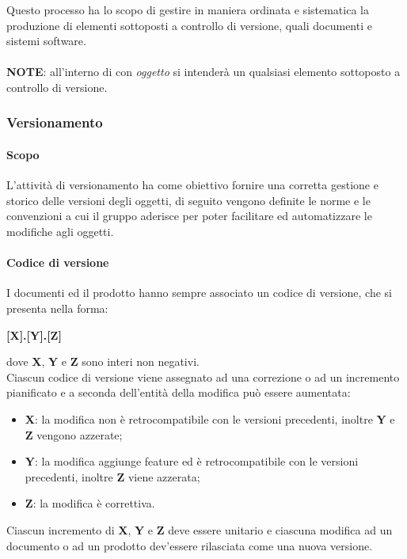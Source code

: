 Questo processo ha lo scopo di gestire in maniera ordinata e sistematica la produzione di elementi sottoposti a controllo di versione,
quali documenti e sistemi software.
\\
\\
\textbf{NOTE}: all'interno di  con \emph{oggetto} si intenderà un qualsiasi elemento sottoposto a
controllo di versione.

\subsubsection{Versionamento}
\label{ssub:gestione_configurazione:versionamento}

\paragraph{Scopo}

L'attività di versionamento ha come obiettivo fornire una corretta gestione e storico delle versioni degli oggetti, di seguito vengono
definite le norme e le convenzioni a cui il gruppo aderisce per poter facilitare ed automatizzare le modifiche agli oggetti.

\paragraph{Codice di versione}
\label{par:codice_versione}

I documenti ed il prodotto hanno sempre associato un codice di versione, che si presenta nella forma:
\begin{center}
    \textbf{[X].[Y].[Z]}
\end{center}
dove \textbf{X}, \textbf{Y} e \textbf{Z} sono interi non negativi.\\
Ciascun codice di versione viene assegnato ad una correzione o ad un incremento pianificato e a seconda dell'entit\`{a} della modifica
pu\`{o} essere aumentata:
\begin{itemize}
	\item \textbf{X}: la modifica non è retrocompatibile con le versioni precedenti, inoltre \textbf{Y} e \textbf{Z} vengono azzerate;
	\item \textbf{Y}: la modifica aggiunge feature ed è retrocompatibile con le versioni precedenti, inoltre \textbf{Z} viene azzerata;
	\item \textbf{Z}: la modifica è correttiva.
\end{itemize}
Ciascun incremento di \textbf{X}, \textbf{Y} e \textbf{Z} deve essere unitario e ciascuna modifica ad un documento o ad un prodotto
dev'essere rilasciata come una nuova versione.

